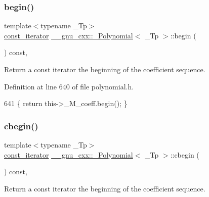 \subsubsection{\texorpdfstring{begin()}{begin()}\hspace{0.1cm}{\footnotesize\ttfamily [2/2]}}
{\footnotesize\ttfamily template$<$typename \+\_\+\+Tp$>$ \\
\hyperlink{class____gnu__cxx_1_1__Polynomial_a96e4523cc2a834724fe4224f0800486b}{const\+\_\+iterator} \hyperlink{class____gnu__cxx_1_1__Polynomial}{\+\_\+\+\_\+gnu\+\_\+cxx\+::\+\_\+\+Polynomial}$<$ \+\_\+\+Tp $>$\+::begin (\begin{DoxyParamCaption}{ }\end{DoxyParamCaption}) const\hspace{0.3cm}{\ttfamily [inline]}, {\ttfamily [noexcept]}}

Return a {\ttfamily const} iterator the beginning of the coefficient sequence. 

Definition at line 640 of file polynomial.\+h.


\begin{DoxyCode}
641       \{ \textcolor{keywordflow}{return} this->\_M\_coeff.begin(); \}
\end{DoxyCode}
\mbox{\label{class____gnu__cxx_1_1__Polynomial_a3309265141727a7581036a2b7632c689}} 
\subsubsection{\texorpdfstring{cbegin()}{cbegin()}}
{\footnotesize\ttfamily template$<$typename \+\_\+\+Tp$>$ \\
\hyperlink{class____gnu__cxx_1_1__Polynomial_a96e4523cc2a834724fe4224f0800486b}{const\+\_\+iterator} \hyperlink{class____gnu__cxx_1_1__Polynomial}{\+\_\+\+\_\+gnu\+\_\+cxx\+::\+\_\+\+Polynomial}$<$ \+\_\+\+Tp $>$\+::cbegin (\begin{DoxyParamCaption}{ }\end{DoxyParamCaption}) const\hspace{0.3cm}{\ttfamily [inline]}, {\ttfamily [noexcept]}}

Return a {\ttfamily const} iterator the beginning of the coefficient sequence. 

